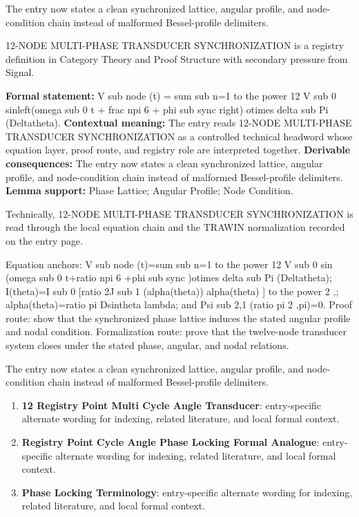 The entry now states a clean synchronized lattice, angular profile, and node-condition chain instead of malformed Bessel-profile delimiters.
\clearpage


\begingroup\small
{}
12-NODE MULTI-PHASE TRANSDUCER SYNCHRONIZATION is a registry definition in Category Theory and Proof Structure with secondary pressure from Signal.

\begingroup\footnotesize\setlength{\emergencystretch}{3em}\sloppy
\textbf{Formal statement:} V sub node (t) = sum sub n=1 to the power 12 V sub 0 sinleft(omega sub 0 t + frac npi 6 + phi sub sync right) otimes delta sub Pi (Deltatheta). \textbf{Contextual meaning:} The entry reads 12-NODE MULTI-PHASE TRANSDUCER SYNCHRONIZATION as a controlled technical headword whose equation layer, proof route, and registry role are interpreted together. \textbf{Derivable consequences:} The entry now states a clean synchronized lattice, angular profile, and node-condition chain instead of malformed Bessel-profile delimiters. \textbf{Lemma support:} Phase Lattice; Angular Profile; Node Condition.\par
\endgroup

Technically, 12-NODE MULTI-PHASE TRANSDUCER SYNCHRONIZATION is read through the local equation chain and the TRAWIN normalization recorded on the entry page.

Equation anchors: V sub node (t)=sum sub n=1 to the power 12 V sub 0 sin (omega sub 0 t+ratio npi 6 +phi sub sync )otimes delta sub Pi (Deltatheta); I(theta)=I sub 0 [ratio 2J sub 1 (alpha(theta)) alpha(theta) ] to the power 2 ,; alpha(theta)=ratio pi Dsintheta lambda; and Psi sub 2,1 (ratio pi 2 ,pi)=0. Proof route: show that the synchronized phase lattice induces the stated angular profile and nodal condition. Formalization route: prove that the twelve-node transducer system closes under the stated phase, angular, and nodal relations.

The entry now states a clean synchronized lattice, angular profile, and node-condition chain instead of malformed Bessel-profile delimiters.
\endgroup

\begin{enumerate}[leftmargin=1.6em,itemsep=6pt,topsep=4pt]
\item \textbf{12 Registry Point Multi Cycle Angle Transducer}: entry-specific alternate wording for indexing, related literature, and local formal context.
\item \textbf{Registry Point Cycle Angle Phase Locking Formal Analogue}: entry-specific alternate wording for indexing, related literature, and local formal context.
\item \textbf{Phase Locking Terminology}: entry-specific alternate wording for indexing, related literature, and local formal context.
\end{enumerate}

